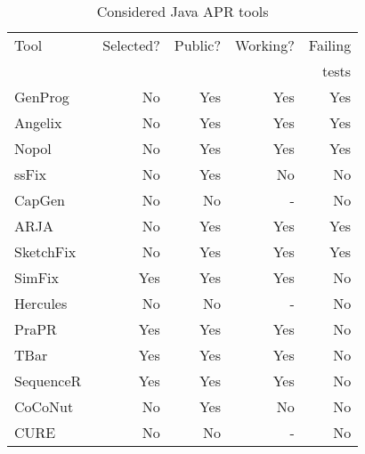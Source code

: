 \documentclass[conference]{IEEEtran}
\begin{document}
\begin{table}[!h]
    \centering
    \caption{Considered Java APR tools}
    \label{tab:apr_tools}
    \begin{tabular}{lrrrr}
        \toprule
        Tool                                & Selected? & Public? & Working? & Failing  \\
                                            &           &         &          & tests      \\
        \midrule

        GenProg~\cite{le2011genprog}        & No        & Yes     & Yes      & Yes       \\
        Angelix~\cite{mechtaev2016angelix}  & No        & Yes     & Yes      & Yes       \\
        Nopol~\cite{xuan:hal-01285008}      & No        & Yes     & Yes      & Yes       \\
        ssFix~\cite{xin2017leveraging}      & No        & Yes     & No       & No        \\
        CapGen~\cite{wen2018context}        & No        & No      & -        & No        \\
        ARJA~\cite{yuan2018arja}            & No        & Yes     & Yes      & Yes       \\
        SketchFix~\cite{hua2018towards}     & No        & Yes     & Yes      & Yes       \\
        SimFix~\cite{jiang2018shaping}      & Yes       & Yes     & Yes      & No        \\
        Hercules~\cite{saha2019harnessing}  & No        & No      & -        & No        \\
        PraPR~\cite{ghanbari2019practical}  & Yes       & Yes     & Yes      & No        \\
        TBar~\cite{liu2019tbar}             & Yes       & Yes     & Yes      & No        \\
        SequenceR~\cite{chen2019sequencer}  & Yes       & Yes     & Yes      & No        \\
        CoCoNut~\cite{lutellier2020coconut} & No        & Yes     & No       & No        \\
        CURE~\cite{jiang2021cure}           & No        & No      & -        & No        \\

        \bottomrule
    \end{tabular}
\end{table}
\end{document}

